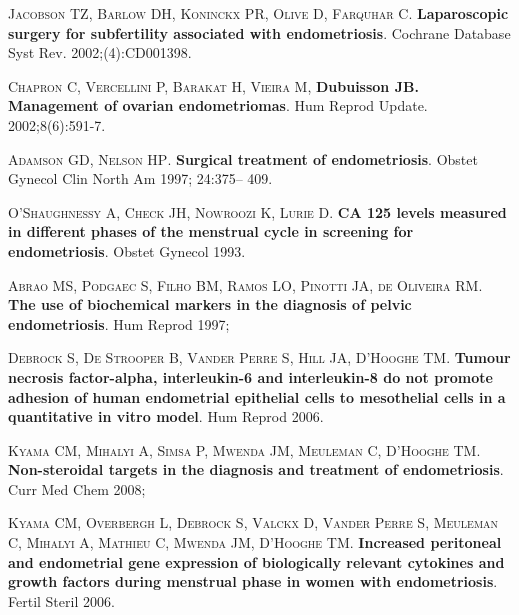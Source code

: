 \documentclass[12pt]{article} %
\begin{document}
\vspace{0,5cm}

\textsc{Jacobson TZ, Barlow DH, Koninckx PR, Olive D, Farquhar C}.\textbf{ Laparoscopic surgery for subfertility associated with endometriosis}. Cochrane Database Syst Rev. 2002;(4):CD001398.

\vspace{0,5cm}


\textsc{Chapron C, Vercellini P, Barakat H, Vieira M}, \textbf{Dubuisson JB. Management of ovarian endometriomas}. Hum Reprod Update. 2002;8(6):591-7.

\textsc{Adamson GD, Nelson HP}. \textbf{Surgical treatment of endometriosis}. Obstet Gynecol Clin North Am 1997; 24:375– 409. 

\vspace{0,5cm}

\textsc{O'Shaughnessy A, Check JH, Nowroozi K, Lurie D}.
\textbf{CA 125 levels measured in different phases of the menstrual cycle in screening for endometriosis}. Obstet Gynecol 1993.

\vspace{0,5cm}

\textsc{Abrao MS, Podgaec S, Filho BM, Ramos LO, Pinotti JA, de Oliveira RM}.\textbf{ The use of biochemical markers in the diagnosis of pelvic endometriosis}. Hum Reprod 1997;

\vspace{0,5cm}

\textsc{Debrock S, De Strooper B, Vander Perre S, Hill JA, D'Hooghe TM}.
\textbf{Tumour necrosis factor-alpha, interleukin-6 and interleukin-8 do not promote adhesion of human endometrial epithelial cells to mesothelial cells in a quantitative in vitro model}. Hum Reprod 2006.

\vspace{0,5cm}

\textsc{Kyama CM, Mihalyi A, Simsa P, Mwenda JM, Meuleman C, D'Hooghe TM}.\textbf{ Non-steroidal targets in the diagnosis and treatment of endometriosis}. Curr Med Chem 2008;

\vspace{0,5cm}

\textsc{Kyama CM, Overbergh L, Debrock S, Valckx D, Vander Perre S, Meuleman C, Mihalyi A, Mathieu C, Mwenda JM, D'Hooghe TM}.
\textbf{Increased peritoneal and endometrial gene expression of biologically relevant cytokines and growth factors during menstrual phase in women with endometriosis}. Fertil Steril 2006.
\end{document}
